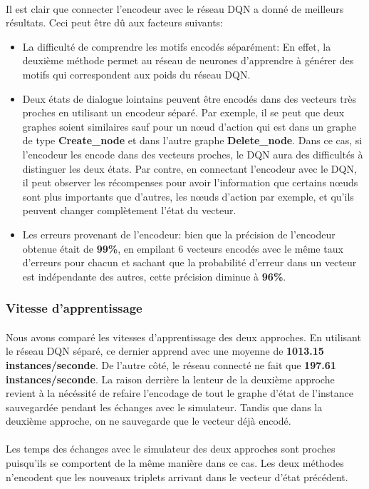 \paragraph{}Il est clair que connecter l'encodeur avec le réseau DQN a donné de meilleurs résultats. Ceci peut être dû aux facteurs suivants:
\begin{itemize}
	\item La difficulté de comprendre les motifs encodés séparément: En effet, la deuxième méthode permet au réseau de neurones d'apprendre à générer des motifs qui correspondent aux poids du réseau DQN.
	\item Deux états de dialogue lointains peuvent être encodés dans des vecteurs très proches en utilisant un encodeur séparé. Par exemple, il se peut que deux graphes soient similaires sauf pour un n\oe{}ud d'action qui est dans un graphe de type \textbf{Create\_node} et dans l'autre graphe \textbf{Delete\_node}. Dans ce cas, si l'encodeur les encode dans des vecteurs proches, le DQN aura des difficultés à distinguer les deux états. Par contre, en connectant l'encodeur avec le DQN, il peut observer les récompenses pour avoir l'information que certains n\oe{}uds sont plus importants que d'autres, les n\oe{}uds d'action par exemple, et qu'ils peuvent changer complètement l'état du vecteur.
	\item Les erreurs provenant de l'encodeur: bien que la précision de l'encodeur obtenue était de \textbf{99\%}, en empilant 6 vecteurs encodés avec le même taux d'erreurs pour chacun et sachant que la probabilité d'erreur dans un vecteur est indépendante des autres, cette précision diminue à \textbf{96\%}.
\end{itemize}
\subsubsection{Vitesse d'apprentissage}
\paragraph{}Nous avons comparé les vitesses d'apprentissage des deux approches. En utilisant le réseau DQN séparé, ce dernier apprend avec une moyenne de \textbf{1013.15 instances/seconde}. De l'autre côté, le réseau connecté ne fait que \textbf{197.61 instances/seconde}. La raison derrière la lenteur de la deuxième approche revient à la nécéssité de refaire l'encodage de tout le graphe d'état de l'instance sauvegardée pendant les échanges avec le simulateur. Tandis que dans la deuxième approche, on ne sauvegarde que le vecteur déjà encodé.\\\\
Les temps des échanges avec le simulateur des deux approches sont proches puisqu'ils se comportent de la même manière dans ce cas. Les deux méthodes n'encodent que les nouveaux triplets arrivant dans le vecteur d'état précédent. 
